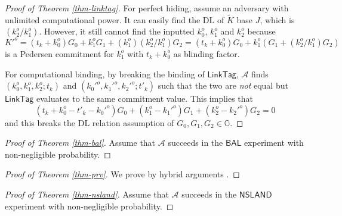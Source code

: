 \documentclass{article}
\theoremstyle{plain}
\theoremstyle{remark}
\begin{document}
\begin{proof}[Proof of Theorem \ref{thm-linktag}]
For perfect hiding, assume an adversary with unlimited computational power. It can easily find the DL of $\tilde{K}$ base $J$, which is $(k_2^o/k_1^o)$. However, it still cannot find the inputted $k_0^o$, $k_1^o$ and $k_2^o$ because $K'^o = (t_k + k_0^o) G_0 + k_1^o G_1 + (k_1^o) (k_2^o/k_1^o) G_2 = (t_k + k_0^o) G_0 + k_1^o (G_1 + (k_2^o/k_1^o) G_2)$ is a Pedersen commitment for $k_1^o$ with $t_k + k_0^o$ as blinding factor.

For computational binding, by breaking the binding of $\textsf{LinkTag}$, $\mathcal{A}$ finds $(k_0^o, k_1^o, k_2^o; t_k)$ and $(k_0'^o, k_1'^o, k_2'^o; t'_k)$ such that the two are \textit{not} equal but $\textsf{LinkTag}$ evaluates to the same commitment value. This implies that
$$(t_k + k_0^o - t'_k - k_0'^o) G_0 + (k_1^o - k_1'^o) G_1 + (k_2^o - k_2'^o) G_2 = 0$$
and this breaks the DL relation assumption of $G_0, G_1, G_2 \in \mathbb{G}$.
\end{proof}
\begin{proof}[Proof of Theorem \ref{thm-bal}]
Assume that $\mathcal{A}$ succeeds in the $\textsf{BAL}$ experiment with non-negligible probability.
\end{proof}
\begin{proof}[Proof of Theorem \ref{thm-prv}]
We prove by hybrid arguments \cite{hybrid}.
\end{proof}
\begin{proof}[Proof of Theorem \ref{thm-nsland}]
Assume that $\mathcal{A}$ succeeds in the $\textsf{NSLAND}$ experiment with non-negligible probability.
\end{proof}
\end{document}
